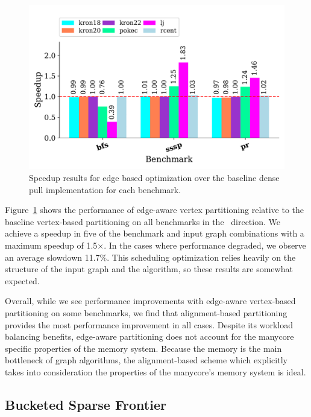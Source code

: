  
\begin{figure}[h]
    \centering
    \includegraphics[scale = 0.6]{graphit-figures/edge.pdf}
    \caption{Speedup results for edge based optimization over the baseline dense pull implementation for each benchmark.}
    \label{pap:generals:sec:eval:fig:edge}
\end{figure}

\edgeAwareHist
 
Figure~\ref{pap:generals:sec:eval:fig:edge} shows the performance of edge-aware vertex partitioning relative to the baseline vertex-based partitioning on all benchmarks in the \pull~direction. 
We achieve a speedup in five of the benchmark and input graph combinations with a maximum speedup of 1.5$\times$.
In the cases where performance degraded, we observe an average slowdown 11.7\%. 
This scheduling optimization relies heavily on the structure of the input graph and the algorithm, so these results are somewhat expected.
 
Overall, while we see performance improvements with edge-aware vertex-based partitioning on some benchmarks, we find that alignment-based partitioning provides the most performance improvement in all cases. 
Despite its workload balancing benefits, edge-aware partitioning does not account for the manycore specific properties of the memory system.
Because the memory is the main bottleneck of graph algorithms, the alignment-based scheme which explicitly takes into consideration the properties of the manycore's memory system is ideal. 

\subsection{Bucketed Sparse Frontier}

